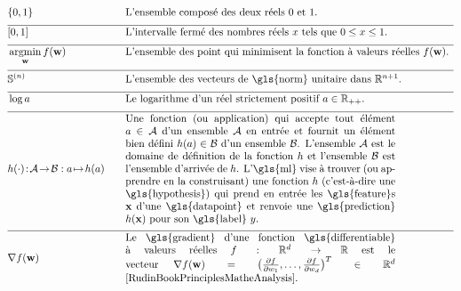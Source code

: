 \newpage
\begin{align}
		&\{0,1\}& \quad & \mbox{L'ensemble composé des deux réels $0$ et $1$.} \nonumber \\[2mm] \hline \nonumber\\[-5mm]
	&[0,1] &\quad &\mbox{L'intervalle fermé des nombres réels $x$ tels que $0 \leq x \leq 1$. }\nonumber \\[2mm] \hline \nonumber\\[-5mm]
    &\argmin_{\weights} f(\weights) &\quad &\mbox{L'ensemble des point qui minimisent la fonction à valeurs réelles $f(\weights)$.  } \nonumber \\[2mm] \hline \nonumber\\[-5mm]
    &\sphere{\nrnodes} &\quad &\mbox{L'ensemble des vecteurs de \gls{norm} unitaire dans $\mathbb{R}^{\nrnodes+1}$.  }\nonumber \\[2mm] \hline \nonumber\\[-5mm]
	 &\log a &\quad &\mbox{Le logarithme d'un réel strictement positif $a \in \mathbb{R}_{++}$.  } \nonumber \\[2mm] \hline \nonumber\\[-5mm]
	 &\hypothesis(\cdot)\!:\!\mathcal{A}\!\rightarrow\!\mathcal{B} :  a \!\mapsto\!h(a) &\quad &\parbox{.75\textwidth}{
	 	Une fonction (ou application) qui accepte tout élément \( a \in \mathcal{A} \) d'un ensemble \( \mathcal{A} \) en entrée et fournit un élément bien défini \( h(a) \in \mathcal{B} \) d'un ensemble \( \mathcal{B} \). L'ensemble \( \mathcal{A} \) est le domaine de définition de la fonction \( h \) et l'ensemble \( \mathcal{B} \) est l'ensemble d'arrivée de \( \hypothesis \). L'\gls{ml} vise à trouver (ou apprendre en la construisant) une fonction \( \hypothesis \) (c'est-à-dire une \gls{hypothesis}) qui prend en entrée les \gls{feature}s \( \featurevec \) d'une \gls{datapoint} et renvoie une \gls{prediction} \( \hypothesis(\featurevec) \) pour son \gls{label} \( \truelabel \).
 	} \nonumber \\[2mm] \hline \nonumber\\[-5mm]
	 	&\nabla f(\weights) & \quad & \parbox{.75\textwidth}{Le  \gls{gradient} d'une fonction \gls{differentiable} à valeurs réelles
	 	$f: \mathbb{R}^{\featuredim}\rightarrow \mathbb{R}$ est le vecteur
	 	$\nabla f(\weights) = \big( \frac{\partial f}{\partial \weight_{1}},\ldots,\frac{\partial f}{\partial \weight_{\featuredim}}  \big)^{T} \in \mathbb{R}^{\featuredim}$ \cite[Ch. 9]{RudinBookPrinciplesMatheAnalysis}.}   \nonumber
\end{align} 
